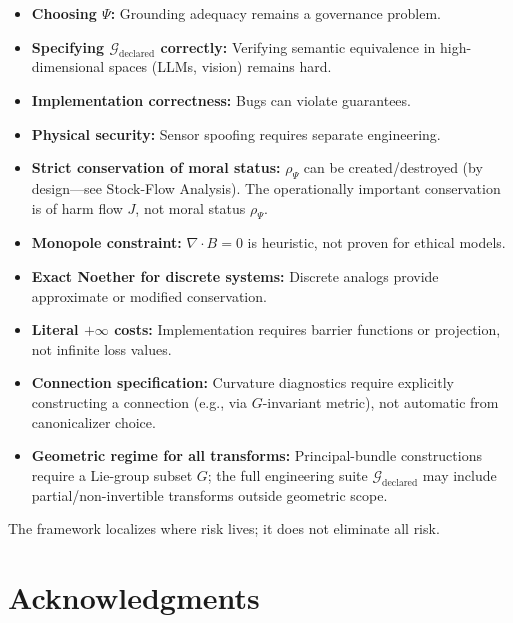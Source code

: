 \documentclass[12pt]{article}
\begin{document}
\begin{itemize}
\item \textbf{Choosing $\Psi$:} Grounding adequacy remains a governance problem.
\item \textbf{Specifying $\mathcal{G}_{\text{declared}}$ correctly:} Verifying semantic equivalence in high-dimensional spaces
(LLMs, vision) remains hard.
\item \textbf{Implementation correctness:} Bugs can violate guarantees.
\item \textbf{Physical security:} Sensor spoofing requires separate engineering.
\item \textbf{Strict conservation of moral status:} $\rho_\Psi$ can be created/destroyed (by design---see Stock-Flow Analysis). The operationally important conservation is of harm flow $J$, not moral status
$\rho_\Psi$.
\item \textbf{Monopole constraint:} $\nabla \cdot B = 0$ is heuristic, not proven for ethical models.
\item \textbf{Exact Noether for discrete systems:} Discrete analogs provide approximate or modified
conservation.
\item \textbf{Literal $+\infty$ costs:} Implementation requires barrier functions or projection, not infinite loss
values.
\item \textbf{Connection specification:} Curvature diagnostics require explicitly constructing a connection
(e.g., via $G$-invariant metric), not automatic from canonicalizer choice.
\item \textbf{Geometric regime for all transforms:} Principal-bundle constructions require a Lie-group
subset $G$; the full engineering suite $\mathcal{G}_{\text{declared}}$ may include partial/non-invertible transforms
outside geometric scope.
\end{itemize}

The framework localizes where risk lives; it does not eliminate all risk.

\section*{Acknowledgments}
\end{document}
